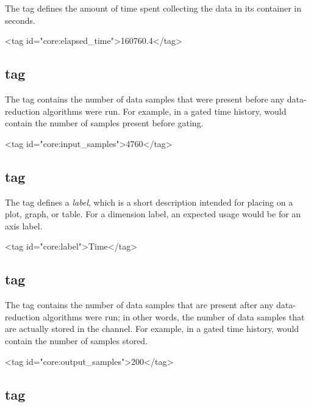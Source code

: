 \documentclass{article}
\begin{document}
The  tag defines the amount of time spent
collecting the data in its container in seconds.

\begin{siexmlexample}
<tag id="core:elapsed_time">160760.4</tag>
\end{siexmlexample}

\subsection{ tag}

The  tag contains the number of data samples
that were present before any data-reduction algorithms were run.  For
example, in a gated time history,  would
contain the number of samples present before gating.

\begin{siexmlexample}
<tag id="core:input_samples">4760</tag>
\end{siexmlexample}

\subsection{ tag}

The  tag defines a \emph{label}, which is a short
description intended for placing on a plot, graph, or table.  For a
dimension label, an expected usage would be for an axis label.

\begin{siexmlexample}
<tag id="core:label">Time</tag>
\end{siexmlexample}

\subsection{ tag}

The  tag contains the number of data samples
that are present after any data-reduction algorithms were run; in
other words, the number of data samples that are actually stored in
the channel.  For example, in a gated time history,
 would contain the number of samples stored.

\begin{siexmlexample}
<tag id="core:output_samples">200</tag>
\end{siexmlexample}

\subsection{ tag}
\end{document}
